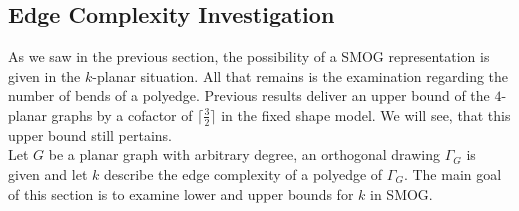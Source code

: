 \subsection{Edge Complexity Investigation}
As we saw in the previous section, the possibility of a SMOG representation is given in the $k$-planar situation. All that remains is the examination regarding the number of bends of a polyedge. Previous results deliver an upper bound of the $4$-planar graphs by a cofactor of $\lceil\frac{3}{2}\rceil$ in the fixed shape model. We will see, that this upper bound still pertains.\\
Let $G$ be a planar graph with arbitrary degree, an orthogonal drawing $\Gamma_G$ is given and let $k$ describe the edge complexity of a polyedge of $\Gamma_G$. The main goal of this section is to examine lower and upper bounds for $k$ in SMOG.
